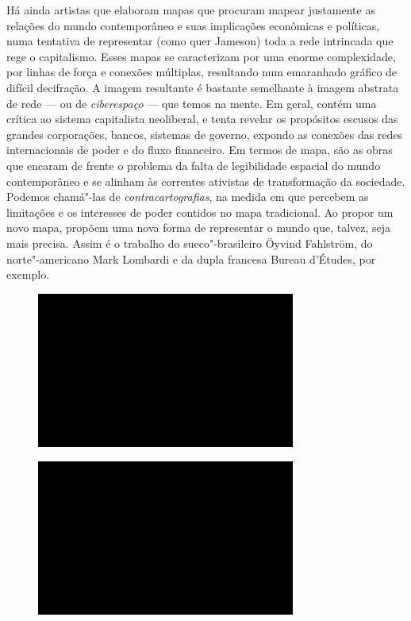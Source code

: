 Há ainda artistas que elaboram mapas que procuram mapear justamente as
relações do mundo contemporâneo e suas implicações econômicas e
políticas, numa tentativa de representar (como quer Jameson) toda a rede
intrincada que rege o capitalismo. Esses mapas se caracterizam por uma
enorme complexidade, por linhas de força e conexões múltiplas,
resultando num emaranhado gráfico de difícil decifração. A imagem
resultante é bastante semelhante à imagem abstrata de rede --- ou de
\emph{ciberespaço} --- que temos na mente. Em geral, contém uma crítica
ao sistema capitalista neoliberal, e tenta revelar os propósitos escusos
das grandes corporações, bancos, sistemas de governo, expondo as
conexões das redes internacionais de poder e do fluxo financeiro. Em
termos de mapa, são as obras que encaram de frente o problema da falta
de legibilidade espacial do mundo contemporâneo e se alinham às
correntes ativistas de transformação da sociedade. Podemos chamá"-las de
\emph{contracartografias}, na medida em que percebem as limitações e os
interesses de poder contidos no mapa tradicional. Ao propor um novo
mapa, propõem uma nova forma de representar o mundo que, talvez, seja
mais precisa. Assim é o trabalho do sueco"-brasileiro Öyvind Fahlström,
do norte"-americano Mark Lombardi e da dupla francesa Bureau d'Études,
por exemplo.

\begin{figure}[!ht]

\centering
 \includegraphics[width=85mm]{./imgs/im1.jpg}
\caption{\tiny{}}

\end{figure}

\begin{figure}[!ht]

\centering
 \includegraphics[width=85mm]{./imgs/im1.jpg}
\caption{\tiny{}}

\end{figure}

